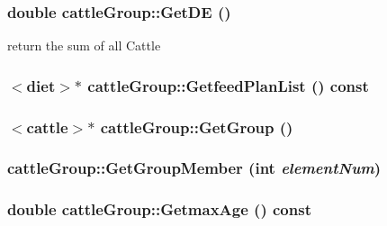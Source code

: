 \label{classcattle_group_a28dcd27ede1d2e379ac9393fbfe6bf3a}
\hypertarget{classcattle_group_a8ca2bba9c9b426014ad7ea7f87df06f3}{
\subsubsection[{GetDE}]{\setlength{\rightskip}{0pt plus 5cm}double cattleGroup::GetDE ()}}
\label{classcattle_group_a8ca2bba9c9b426014ad7ea7f87df06f3}
return the sum of all Cattle \hypertarget{classcattle_group_a0eeb9f3381e384d990fbedf6a5fd5b16}{
\subsubsection[{GetfeedPlanList}]{$<${\bf diet}$>$$\ast$ cattleGroup::GetfeedPlanList () const}}
\label{classcattle_group_a0eeb9f3381e384d990fbedf6a5fd5b16}
\hypertarget{classcattle_group_a47b11b9e0be1fb80820d8f86977ec707}{
\subsubsection[{GetGroup}]{$<${\bf cattle}$>$$\ast$ cattleGroup::GetGroup ()}}
\label{classcattle_group_a47b11b9e0be1fb80820d8f86977ec707}
\hypertarget{classcattle_group_a2242557ba924ba92be1cbf0d25b6f422}{
\subsubsection[{GetGroupMember}]{ cattleGroup::GetGroupMember (int {\em elementNum})}}
\label{classcattle_group_a2242557ba924ba92be1cbf0d25b6f422}
\hypertarget{classcattle_group_ad9430200dcf4bbad6566b60680834a63}{
\subsubsection[{GetmaxAge}]{\setlength{\rightskip}{0pt plus 5cm}double cattleGroup::GetmaxAge () const}}
